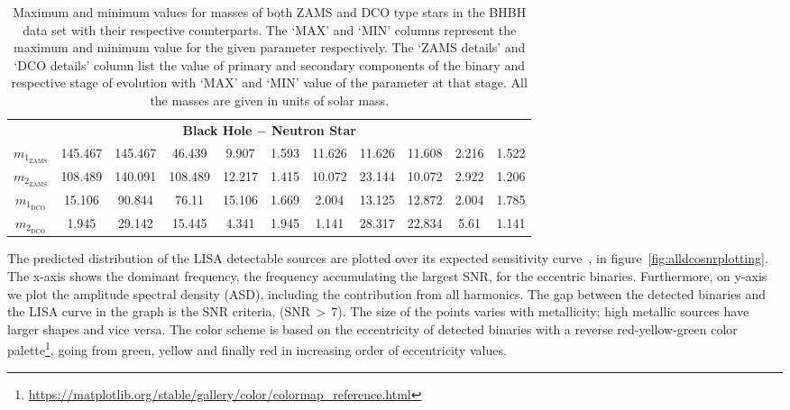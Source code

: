 \documentclass[journal, twocolumns]{IEEEtran}
\newcommand{\mone}[1]{m_{1_{\text{#1}}}}
\newcommand{\mtwo}[1]{m_{2_{\text{#1}}}}
\begin{document}
\begin{table}[!h]
{\begin{tabular}{@{}ccccccccccc@{}}
				\multicolumn{11}{c}{\textbf{Black Hole $-$ Neutron Star}} \\
				
				$\mone{ZAMS}$ & 145.467 & 145.467 & 46.439    & 9.907   & 1.593     & 11.626 & 11.626  & 11.608    & 2.216   & 1.522     \\
				$\mtwo{ZAMS}$ & 108.489 & 140.091 & 108.489   & 12.217  & 1.415     & 10.072 & 23.144  & 10.072    & 2.922   & 1.206     \\
				$\mone{DCO}$  & 15.106  & 90.844  & 76.11     & 15.106  & 1.669     & 2.004  & 13.125  & 12.872    & 2.004   & 1.785     \\
				$\mtwo{DCO}$  & 1.945   & 29.142  & 15.445    & 4.341   & 1.945     & 1.141  & 28.317  & 22.834    & 5.61    & 1.141     \\ \bottomrule
			\end{tabular}%
		}
		\caption{Maximum and minimum values for masses of both ZAMS and DCO type stars in the BHBH data set with their respective counterparts. The `MAX' and `MIN' columns represent the maximum and minimum value for the given parameter respectively. The `ZAMS details' and `DCO details' column list the value of primary and secondary components of the binary and respective stage of evolution with `MAX' and `MIN' value of the parameter at that stage. All the masses are given in units of solar mass.}
		\label{tab:bhbh-details-table}
	\end{table}

    The predicted distribution of the LISA detectable sources are plotted over its expected sensitivity curve~\cite{Robson2019}, in figure~\ref{fig:alldcosnrplotting}.
	The x-axis shows the dominant frequency, the frequency accumulating the largest SNR, for the eccentric binaries.
	Furthermore, on y-axis we plot the amplitude spectral density (ASD), including the contribution from all harmonics.
	The gap between the detected binaries and the LISA curve in the graph is the SNR criteria, ($\text{SNR}\,>\,7$).
	The size of the points varies with metallicity; high metallic sources have larger shapes and vice versa.
	The color scheme is based on the eccentricity of detected binaries with a reverse red-yellow-green color palette\footnote{\url{https://matplotlib.org/stable/gallery/color/colormap_reference.html}}, going from green, yellow and finally red in increasing order of eccentricity values.
\end{document}
